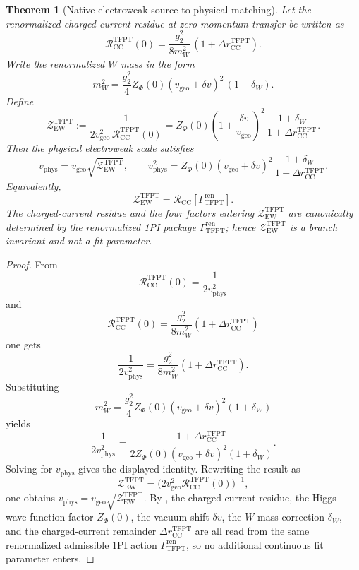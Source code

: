 \documentclass[11pt,a4paper]{article}
\newtheorem{theorem}{Theorem}[section]
\theoremstyle{definition}
\theoremstyle{remark}
\newcommand{\vgeo}{v_{\mathrm{geo}}}
\begin{document}
\begin{theorem}[Native electroweak source-to-physical matching]
\label{thm:ew-geometric-to-physical-matching}
Let the renormalized charged-current residue at zero momentum transfer be written as
\[
\mathcal R_{\mathrm{CC}}^{\mathrm{TFPT}}(0)
=
\frac{g_2^2}{8m_W^2}\,(1+\Delta r_{\mathrm{CC}}^{\mathrm{TFPT}}).
\]
Write the renormalized $W$ mass in the form
\[
m_W^2=
\frac{g_2^2}{4}Z_\Phi(0)(\vgeo+\delta v)^2\,(1+\delta_W).
\]
Define
\[
\mathcal Z_{\mathrm{EW}}^{\mathrm{TFPT}}
:=
 \frac{1}{2\vgeo^2\,\mathcal R_{\mathrm{CC}}^{\mathrm{TFPT}}(0)}
 =
Z_\Phi(0)\left(1+\frac{\delta v}{\vgeo}\right)^2
\,\frac{1+\delta_W}{1+\Delta r_{\mathrm{CC}}^{\mathrm{TFPT}}}.
\]
Then the physical electroweak scale satisfies
\[
v_{\mathrm{phys}}
=
\vgeo\sqrt{\mathcal Z_{\mathrm{EW}}^{\mathrm{TFPT}}},
\qquad
v_{\mathrm{phys}}^2
=
Z_\Phi(0)(\vgeo+\delta v)^2\,\frac{1+\delta_W}{1+\Delta r_{\mathrm{CC}}^{\mathrm{TFPT}}}.
\]
Equivalently,
\[
\mathcal Z_{\mathrm{EW}}^{\mathrm{TFPT}}
=
\mathcal R_{\mathrm{CC}}\!\left[\Gamma_{\mathrm{TFPT}}^{\mathrm{ren}}\right].
\]
The charged-current residue and the four factors entering $\mathcal Z_{\mathrm{EW}}^{\mathrm{TFPT}}$
are canonically determined by the renormalized 1PI package $\Gamma_{\mathrm{TFPT}}^{\mathrm{ren}}$;
hence
$\mathcal Z_{\mathrm{EW}}^{\mathrm{TFPT}}$ is a branch invariant and not a fit parameter.
\end{theorem}

\begin{proof}
From
\[
\mathcal R_{\mathrm{CC}}^{\mathrm{TFPT}}(0)=\frac{1}{2v_{\mathrm{phys}}^2}
\]
and
\[
\mathcal R_{\mathrm{CC}}^{\mathrm{TFPT}}(0)=\frac{g_2^2}{8m_W^2}(1+\Delta r_{\mathrm{CC}}^{\mathrm{TFPT}})
\]
one gets
\[
\frac{1}{2v_{\mathrm{phys}}^2}
=
\frac{g_2^2}{8m_W^2}(1+\Delta r_{\mathrm{CC}}^{\mathrm{TFPT}}).
\]
Substituting
\[
m_W^2=
\frac{g_2^2}{4}Z_\Phi(0)(\vgeo+\delta v)^2(1+\delta_W)
\]
yields
\[
\frac{1}{2v_{\mathrm{phys}}^2}
=
\frac{1+\Delta r_{\mathrm{CC}}^{\mathrm{TFPT}}}
{2Z_\Phi(0)(\vgeo+\delta v)^2(1+\delta_W)}.
\]
Solving for $v_{\mathrm{phys}}$ gives the displayed identity. Rewriting the result as
\[
\mathcal Z_{\mathrm{EW}}^{\mathrm{TFPT}}
=
\bigl(2\vgeo^2\mathcal R_{\mathrm{CC}}^{\mathrm{TFPT}}(0)\bigr)^{-1},
\]
one obtains $v_{\mathrm{phys}}=\vgeo\sqrt{\mathcal Z_{\mathrm{EW}}^{\mathrm{TFPT}}}$. By
, the charged-current residue, the Higgs wave-function factor
$Z_\Phi(0)$, the vacuum shift $\delta v$, the $W$-mass correction $\delta_W$, and the charged-current
remainder $\Delta r_{\mathrm{CC}}^{\mathrm{TFPT}}$ are all read from the same renormalized
admissible 1PI action $\Gamma_{\mathrm{TFPT}}^{\mathrm{ren}}$, so no additional continuous fit
parameter enters.
\end{proof}
\end{document}
